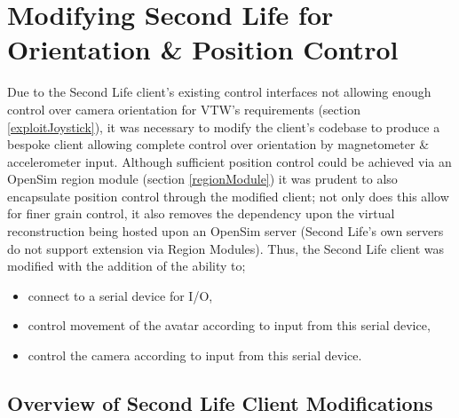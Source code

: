 \section{Modifying Second Life for Orientation \& Position Control}

Due to the Second Life client's existing control interfaces not allowing enough control over camera orientation for VTW's requirements (section \ref{exploitJoystick}), it was necessary to modify the client's codebase to produce a bespoke client allowing complete control over orientation by magnetometer \& accelerometer input. Although sufficient position control could be achieved via an OpenSim region module (section \ref{regionModule}) it was prudent to also encapsulate position control through the modified client; not only does this allow for finer grain control, it also removes the dependency upon the virtual reconstruction being hosted upon an OpenSim server (Second Life's own servers do not support extension via Region Modules). Thus, the Second Life client was modified with the addition of the ability to;

\begin{itemize}
	\item connect to a serial device for I/O,
	\item control movement of the avatar according to input from this serial device,
	\item control the camera according to input from this serial device.
\end{itemize}


\subsection{Overview of Second Life Client Modifications}

\newcommand{\asioFootnote}{\footnote{\url{http://www.boost.org/doc/libs/1_57_0/doc/html/boost_asio.html}}}

\newcommand{\boostFootnote}{\footnote{\url{http://www.boost.org/}}}

\newcommand{\fedetftFootnote}{\footnote{\url{http://www.webalice.it/fede.tft/serial_port/serial_port.html}}}

\newcommand{\regionmodulelimitationFootnote}{\footnote{This is not due to any limitation on the part of OpenSim, but simply due to the Second Life client modifications being pursued further than the OpenSim module.}}

